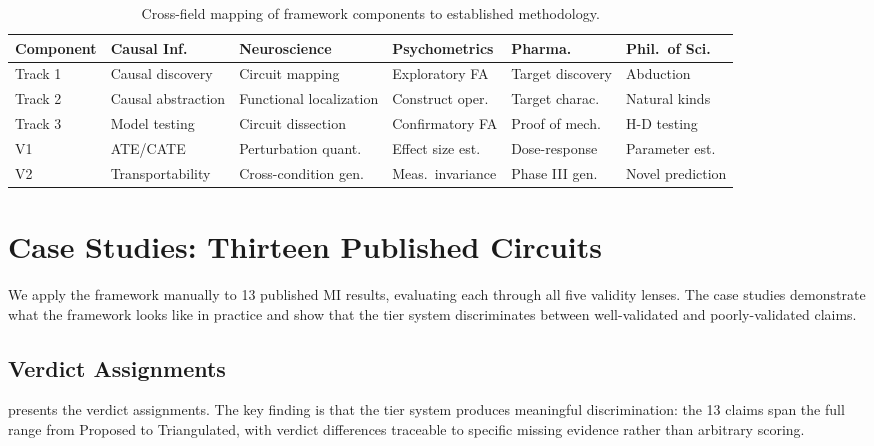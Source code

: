 \documentclass[10pt]{article}
\newcommand{\tighttable}{\setlength{\tabcolsep}{4pt}\renewcommand{\arraystretch}{1.05}}
\begin{document}
\begin{table}[t]
\centering
\tighttable
\caption{Cross-field mapping of framework components to established methodology.}
\label{tab:crossfield}
\small
\begin{tabular}{@{}lp{2.0cm}p{2.0cm}p{2.0cm}p{1.8cm}p{2.0cm}@{}}
\toprule
\textbf{Component} & \textbf{Causal Inf.} & \textbf{Neuroscience} & \textbf{Psychometrics} & \textbf{Pharma.} & \textbf{Phil.\ of Sci.} \\
\midrule
Track 1 & Causal discovery & Circuit mapping & Exploratory FA & Target discovery & Abduction \\
Track 2 & Causal abstraction & Functional localization & Construct oper. & Target charac. & Natural kinds \\
Track 3 & Model testing & Circuit dissection & Confirmatory FA & Proof of mech. & H-D testing \\
V1 & ATE/CATE & Perturbation quant. & Effect size est. & Dose-response & Parameter est. \\
V2 & Transportability & Cross-condition gen. & Meas.\ invariance & Phase III gen. & Novel prediction \\
\bottomrule
\end{tabular}
\end{table}

\section{Case Studies: Thirteen Published Circuits}
\label{sec:case-studies}

We apply the framework manually to 13 published MI results, evaluating each through all five validity lenses. The case studies demonstrate what the framework looks like in practice and show that the tier system discriminates between well-validated and poorly-validated claims.


\subsection{Verdict Assignments}

 presents the verdict assignments. The key finding is that the tier system produces meaningful discrimination: the 13 claims span the full range from Proposed to Triangulated, with verdict differences traceable to specific missing evidence rather than arbitrary scoring.
\end{document}
